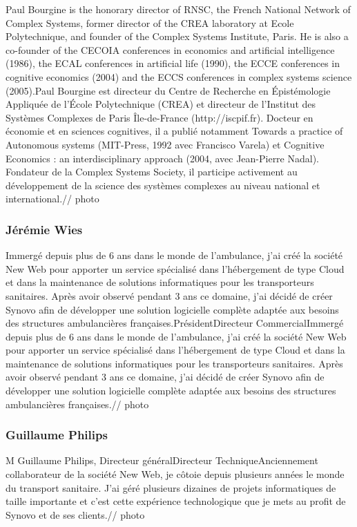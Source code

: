 \documentclass[french, 11pt]{memoir}
\begin{document}
Paul Bourgine is the honorary director of RNSC, the French National
Network of Complex Systems, former director of the CREA laboratory at
Ecole Polytechnique, and founder of the Complex Systems Institute,
Paris. He is also a co-founder of the CECOIA conferences in economics
and artificial intelligence (1986), the ECAL conferences in artificial
life (1990), the ECCE conferences in cognitive economics (2004) and the
ECCS conferences in complex systems science (2005).Paul Bourgine est
directeur du Centre de Recherche en Épistémologie Appliquée de l'École
Polytechnique (CREA) et directeur de l'Institut des Systèmes Complexes
de Paris Île-de-France (http://iscpif.fr). Docteur en économie et en
sciences cognitives, il a publié notamment Towards a practice of
Autonomous systems (MIT-Press, 1992 avec Francisco Varela) et Cognitive
Economics : an interdisciplinary approach (2004, avec Jean-Pierre
Nadal). Fondateur de la Complex Systems Society, il participe activement
au développement de la science des systèmes complexes au niveau national
et international.// photo

\subsubsection{Jérémie Wies}\label{juxe9ruxe9mie-wies}

Immergé depuis plus de 6 ans dans le monde de l'ambulance, j'ai créé la
société New Web pour apporter un service spécialisé dans l'hébergement
de type Cloud et dans la maintenance de solutions informatiques pour les
transporteurs sanitaires. Après avoir observé pendant 3 ans ce domaine,
j'ai décidé de créer Synovo afin de développer une solution logicielle
complète adaptée aux besoins des structures ambulancières
françaises.PrésidentDirecteur CommercialImmergé depuis plus de 6 ans
dans le monde de l'ambulance, j'ai créé la société New Web pour apporter
un service spécialisé dans l'hébergement de type Cloud et dans la
maintenance de solutions informatiques pour les transporteurs
sanitaires. Après avoir observé pendant 3 ans ce domaine, j'ai décidé de
créer Synovo afin de développer une solution logicielle complète adaptée
aux besoins des structures ambulancières françaises.// photo

\subsubsection{Guillaume Philips}\label{guillaume-philips}

M Guillaume Philips, Directeur généralDirecteur TechniqueAnciennement
collaborateur de la société New Web, je côtoie depuis plusieurs années
le monde du transport sanitaire. J'ai géré plusieurs dizaines de projets
informatiques de taille importante et c'est cette expérience
technologique que je mets au profit de Synovo et de ses clients.// photo
\end{document}
